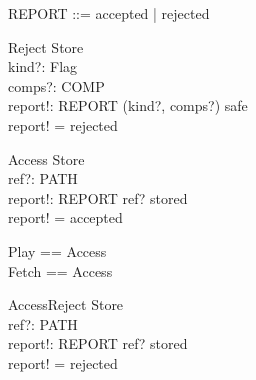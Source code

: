 \documentclass{article}
\begin{document}
\begin{zed}
  REPORT ::= accepted | rejected
\end{zed}

\begin{schema}{Reject}
  \Xi Store \\
  kind?: Flag \\
  comps?: \seq COMP \\
  report!: REPORT
\where
  (kind?, comps?) \notin safe \\
  report! = rejected
\end{schema}

\begin{schema}{Access}
  \Xi Store \\
  ref?: PATH \\
  report!: REPORT
\where
  ref? \in stored \\
  report! = accepted
\end{schema}

\begin{zed}
  Play == Access \\
  Fetch == Access
\end{zed}

\begin{schema}{AccessReject}
  \Xi Store \\
  ref?: PATH \\
  report!: REPORT
\where
  ref? \notin stored \\
  report! = rejected
\end{schema}
\end{document}

